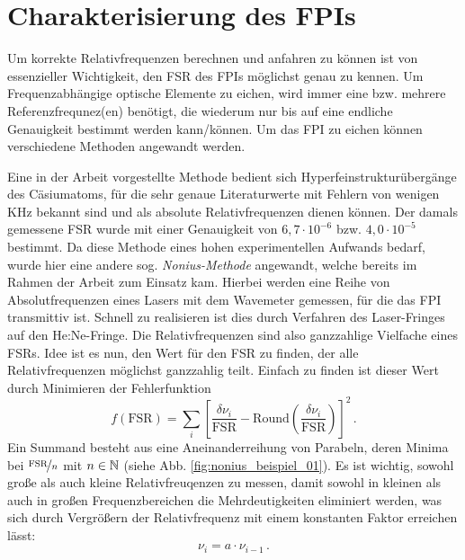 \section{Charakterisierung des FPIs}\label{charakterisierung_FPI}
Um korrekte Relativfrequenzen berechnen und anfahren zu können ist von
essenzieller Wichtigkeit, den FSR des FPIs möglichst genau zu kennen. Um
Frequenzabhängige optische Elemente zu eichen, wird immer eine bzw. mehrere
Referenzfrequnez(en) benötigt, die wiederum nur bis auf eine endliche
Genauigkeit bestimmt werden kann/können. Um das FPI zu eichen können
verschiedene Methoden angewandt werden.\par
Eine in der Arbeit \cite{kuschnick:2000:diplomarbeit} vorgestellte Methode 
bedient sich Hyperfeinstrukturübergänge des Cäsiumatoms, für die sehr genaue
Literaturwerte mit Fehlern von wenigen KHz \cite{PhysRevA.38.1616} bekannt sind
und als absolute Relativfrequenzen dienen können. Der damals gemessene FSR wurde
mit einer Genauigkeit von $6,7\cdot10^{-6}$ bzw. $4,0\cdot10^{-5}$ bestimmt. Da
diese Methode eines hohen experimentellen Aufwands bedarf, wurde hier
eine andere sog. \textit{Nonius-Methode} angewandt, welche bereits im Rahmen der
Arbeit \cite{schumann:2005:dissertation} zum Einsatz kam. Hierbei werden eine
Reihe von Absolutfrequenzen eines Lasers mit dem Wavemeter gemessen, für die das
FPI transmittiv ist. Schnell zu realisieren ist dies durch Verfahren des
Laser-Fringes auf den He:Ne-Fringe. Die Relativfrequenzen sind also ganzzahlige
Vielfache eines FSRs. Idee ist es nun, den Wert für den FSR zu finden, der alle
Relativfrequenzen möglichst ganzzahlig teilt. Einfach zu finden ist dieser Wert durch Minimieren der Fehlerfunktion
\begin{equation}\label{eq:nonius}
	f(\text{FSR})=\sum\limits_i\left[\frac{\delta\nu_i}{\text{FSR}}-\text{Round}\left(\frac{\delta\nu_i}{\text{FSR}}\right)\right]^2\,.
\end{equation}
Ein Summand besteht aus eine Aneinanderreihung von Parabeln, deren Minima bei
$\nicefrac{\text{FSR}}{n}$ mit $n\in\mathbb{N}$ (siehe Abb.
\ref{fig:nonius_beispiel_01}).
Es ist wichtig, sowohl große als auch kleine Relativfreuqenzen zu messen, damit sowohl in kleinen als auch in großen
Frequenzbereichen die Mehrdeutigkeiten eliminiert werden, was sich durch
Vergrößern der Relativfrequenz mit einem konstanten Faktor erreichen lässt:
\begin{equation}\label{eq:nonius_faktor}
	\nu_i=a\cdot\nu_{i-1}\,.
\end{equation}
